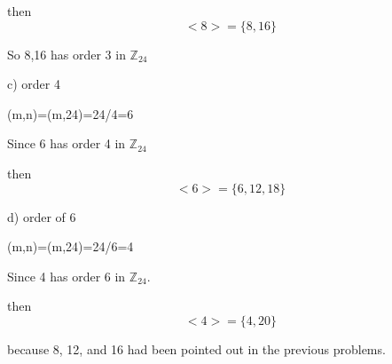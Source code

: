 \documentclass{article}
\begin{document}
then $$<8>=\{8,16\}$$

So 8,16 has order 3 in $\mathbb{Z}_{24} $


\medskip
c) order 4
\medskip

(m,n)=(m,24)=24/4=6

\medskip

Since 6 has order 4 in $\mathbb{Z}_{24}$
\medskip

then $$<6>=\{ 6, 12, 18\}$$



\medskip
d) order of 6


(m,n)=(m,24)=24/6=4
\medskip

Since 4 has order 6 in $\mathbb{Z}_{24}$.

\medskip
then $$<4>=\{4, 20\}$$

because 8, 12, and 16 had been pointed out in the previous problems. 
\end{document}
